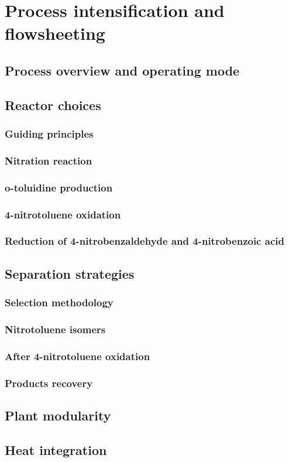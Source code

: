 \section{Process intensification and flowsheeting}

\subsection{Process overview and operating mode}

\subsection{Reactor choices}

\subsubsection{Guiding principles}

\subsubsection{Nitration reaction}

\subsubsection{o-toluidine production}

\subsubsection{4-nitrotoluene oxidation}

\subsubsection{Reduction of 4-nitrobenzaldehyde and 4-nitrobenzoic acid}


\subsection{Separation strategies}

\subsubsection{Selection methodology}

\subsubsection{Nitrotoluene isomers}

\subsubsection{After 4-nitrotoluene oxidation}

\subsubsection{Products recovery}


\subsection{Plant modularity}

\subsection{Heat integration}